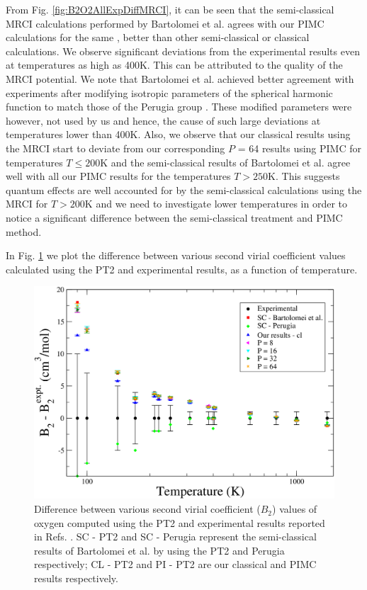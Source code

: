     From Fig. \ref{fig:B2O2AllExpDiffMRCI}, it can be seen that the semi-classical MRCI calculations performed by Bartolomei et al. \cite{Bartolomei2010} agrees with our PIMC calculations for the same \PESs{}, better than other semi-classical or classical calculations. We observe significant deviations from the experimental results even at temperatures as high as 400K. This can be attributed to the quality of the MRCI potential. We note that Bartolomei et al. \cite{Bartolomei2010} achieved better agreement with experiments after modifying isotropic parameters of the spherical harmonic function to match those of the Perugia group \cite{Aquilanti1999}. These modified parameters were however, not used by us and hence, the cause of such large deviations at temperatures lower than 400K. Also, we observe that our classical results using the MRCI \PESs{} start to deviate from our corresponding $P$ = 64 results using PIMC for temperatures $T \le 200$K and the semi-classical results of Bartolomei et al. \cite{Bartolomei2010} agree well with all our PIMC results for the temperatures $T > 250$K. This suggests quantum effects are well accounted for by the semi-classical calculations using the MRCI \PESs{} for $T > 200$K and we need to investigate lower temperatures in order to notice a significant difference between the semi-classical treatment and PIMC method.

    In Fig. \ref{fig:B2O2AllExpDiffPT2} we plot the difference between various second virial coefficient values calculated using the PT2 \PESs{} and experimental results, as a function of temperature.
    \begin{figure}[!htbp]
        \centering
        \includegraphics[scale=0.20,keepaspectratio]{Chapter-6/Figures/B2O2AllExpDiffPT2.png}
        \caption{Difference between various second virial coefficient ($B_2$) values of oxygen computed using the PT2 \PESs{} and experimental results reported in Refs. \cite{Bartolomei2010,Dymond}. SC - PT2 and SC - Perugia represent the semi-classical results of Bartolomei et al. \cite{Bartolomei2010} by using the PT2 and Perugia \PESs{} \cite{Aquilanti1999} respectively; CL - PT2 and PI - PT2 are our classical and PIMC results respectively.}
        \label{fig:B2O2AllExpDiffPT2}
    \end{figure}

